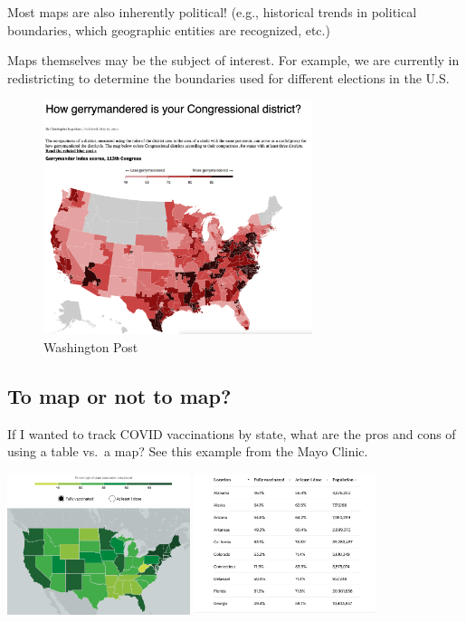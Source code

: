 \documentclass[
  letterpaper,
  DIV=11,
  numbers=noendperiod]{scrreprt}
\begin{document}
Most maps are also inherently political! (e.g., historical trends in
political boundaries, which geographic entities are recognized, etc.)

Maps themselves may be the subject of interest. For example, we are
currently in redistricting to determine the boundaries used for
different elections in the U.S.

\begin{figure}

{\centering \includegraphics[width=0.7\textwidth,height=\textheight]{images/gerrym.png}

}

\caption{Washington Post}

\end{figure}

\hypertarget{to-map-or-not-to-map}{%
\subsection{To map or not to map?}\label{to-map-or-not-to-map}}

If I wanted to track COVID vaccinations by state, what are the pros and
cons of using a table vs.~a map? See this example from the Mayo Clinic.

\includegraphics[width=0.4\textwidth,height=\textheight]{images/covidvaccmap.png}
\includegraphics[width=0.4\textwidth,height=\textheight]{images/covidvacctab.png}
\end{document}
